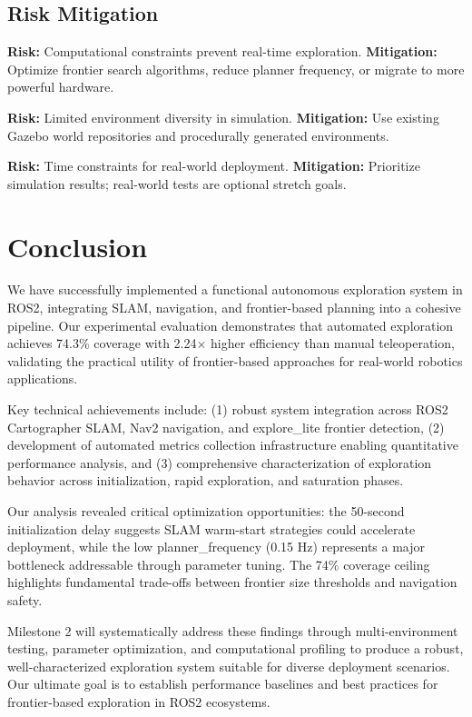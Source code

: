\documentclass[conference]{IEEEtran}
\begin{document}
\subsection{Risk Mitigation}

\textbf{Risk:} Computational constraints prevent real-time exploration. \textbf{Mitigation:} Optimize frontier search algorithms, reduce planner frequency, or migrate to more powerful hardware.

\textbf{Risk:} Limited environment diversity in simulation. \textbf{Mitigation:} Use existing Gazebo world repositories and procedurally generated environments.

\textbf{Risk:} Time constraints for real-world deployment. \textbf{Mitigation:} Prioritize simulation results; real-world tests are optional stretch goals.

\section{Conclusion}

We have successfully implemented a functional autonomous exploration system in ROS2, integrating SLAM, navigation, and frontier-based planning into a cohesive pipeline. Our experimental evaluation demonstrates that automated exploration achieves 74.3\% coverage with 2.24$\times$ higher efficiency than manual teleoperation, validating the practical utility of frontier-based approaches for real-world robotics applications.

Key technical achievements include: (1) robust system integration across ROS2 Cartographer SLAM, Nav2 navigation, and explore\_lite frontier detection, (2) development of automated metrics collection infrastructure enabling quantitative performance analysis, and (3) comprehensive characterization of exploration behavior across initialization, rapid exploration, and saturation phases.

Our analysis revealed critical optimization opportunities: the 50-second initialization delay suggests SLAM warm-start strategies could accelerate deployment, while the low planner\_frequency (0.15 Hz) represents a major bottleneck addressable through parameter tuning. The 74\% coverage ceiling highlights fundamental trade-offs between frontier size thresholds and navigation safety.

Milestone 2 will systematically address these findings through multi-environment testing, parameter optimization, and computational profiling to produce a robust, well-characterized exploration system suitable for diverse deployment scenarios. Our ultimate goal is to establish performance baselines and best practices for frontier-based exploration in ROS2 ecosystems.
\end{document}
